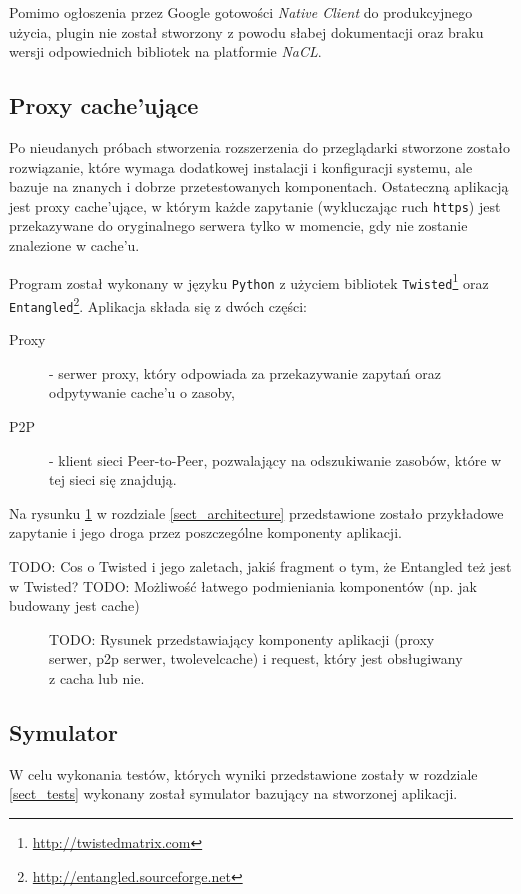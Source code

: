 \documentclass[a4paper,11pt]{scrartcl}
\newcommand{\f}{\texttt}
\newcommand{\s}{ }
\newcommand{\keszu}{cache'u}
\newcommand{\keszujace}{cache'ujące}
\begin{document}
Pomimo ogłoszenia przez Google gotowości \textit{Native Client} do produkcyjnego użycia, plugin nie został stworzony z powodu słabej dokumentacji oraz braku wersji odpowiednich bibliotek na platformie \textit{NaCL}.

\subsection{Proxy \keszujace}
\label{sect_impl_proxy}
Po nieudanych próbach stworzenia rozszerzenia do przeglądarki stworzone zostało rozwiązanie, które wymaga dodatkowej instalacji i konfiguracji systemu, ale bazuje na znanych i dobrze przetestowanych komponentach. Ostateczną aplikacją jest proxy \keszujace, w którym każde zapytanie (wykluczając ruch \f{https}) jest przekazywane do oryginalnego serwera tylko w momencie, gdy nie zostanie znalezione w \keszu.

Program został wykonany w języku \f{Python} z użyciem bibliotek \f{Twisted}\footnote{\url{http://twistedmatrix.com}} oraz \f{Entangled}\footnote{\url{http://entangled.sourceforge.net}}. Aplikacja składa się z dwóch części:
\begin{description}
  \item[Proxy]{ - serwer proxy, który odpowiada za przekazywanie zapytań oraz odpytywanie \keszu\s o zasoby,}
  \item[P2P]{ - klient sieci Peer-to-Peer, pozwalający na odszukiwanie zasobów, które w tej sieci się znajdują.}
\end{description}
Na rysunku \ref{fig_architecture} w rozdziale \ref{sect_architecture} przedstawione zostało przykładowe zapytanie i jego droga przez poszczególne komponenty aplikacji. 

TODO: Cos o Twisted i jego zaletach, jakiś fragment o tym, że Entangled też jest w Twisted?
TODO: Możliwość łatwego podmieniania komponentów (np. jak budowany jest cache)

\begin{figure}[h]
\caption{TODO: Rysunek przedstawiający komponenty aplikacji (proxy serwer, p2p serwer, twolevelcache) i request, który jest obsługiwany z cacha lub nie.}
\label{fig_architecture}
\end{figure}

\subsection{Symulator}
\label{sect_impl_simulator}
W celu wykonania testów, których wyniki przedstawione zostały w rozdziale \ref{sect_tests} wykonany został symulator bazujący na stworzonej aplikacji. 
\end{document}
